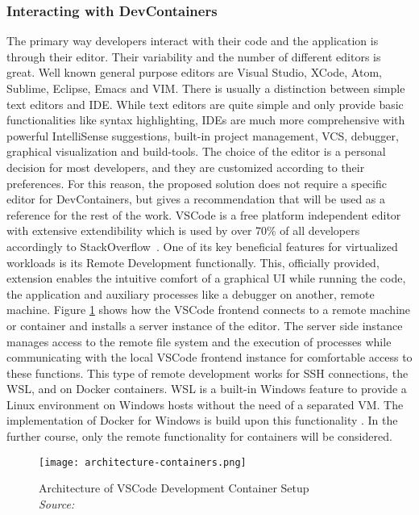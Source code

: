        \subsubsection{Interacting with DevContainers}
        The primary way developers interact with their code and the application is through their editor. Their variability and the number of different editors is great. Well known general purpose editors are Visual Studio, XCode, Atom, Sublime, Eclipse, Emacs and VIM. There is usually a distinction between simple text editors and \acl{IDE}. While text editors are quite simple and only provide basic functionalities like syntax highlighting, \ac{IDE}s are much more comprehensive with powerful IntelliSense suggestions, built-in project management, \ac{VCS}, debugger, graphical visualization and build-tools. The choice of the editor is a personal decision for most developers, and they are customized according to their preferences. For this reason, the proposed solution does not require a specific editor for DevContainers, but gives a recommendation that will be used as a reference for the rest of the work.\newline
        \ac{VSCode} is a free platform independent editor with extensive extendibility which is used by over 70\% of all developers accordingly to StackOverflow~\cite{stackoverflow2021}. One of its key beneficial features for virtualized workloads is its Remote Development functionally. This, officially provided, extension enables the intuitive comfort of a graphical \ac{UI} while running the code, the application and auxiliary processes like a debugger on another, remote machine. Figure \ref{fig::vscodecontainer} shows how the \ac{VSCode} frontend connects to a remote machine or container and installs a server instance of the editor. The server side instance manages access to the remote file system and the execution of processes while communicating with the local \ac{VSCode} frontend instance for comfortable access to these functions. This type of remote development works for \ac{SSH} connections, the \ac{WSL}, and on Docker containers. \ac{WSL} is a built-in Windows feature to provide a Linux environment on Windows hosts without the need of a separated \ac{VM}. The implementation of Docker for Windows is build upon this functionality \cite{vscodedevcontainer}. In the further course, only the remote functionality for containers will be considered.
        \begin{figure}[]
            \centering
            \texttt{[image: architecture-containers.png]}
            \caption{Architecture of \ac{VSCode} Development Container Setup \\\textit{Source:~\cite{vscodedevcontainer}}}\label{fig::vscodecontainer}
        \end{figure}

